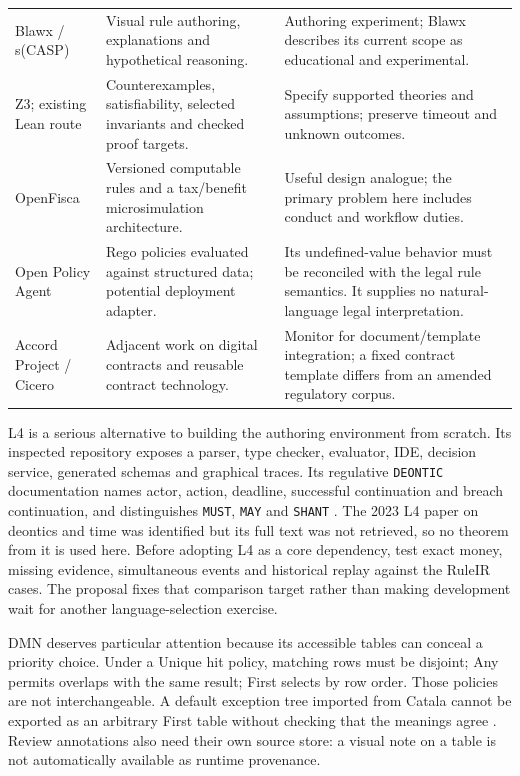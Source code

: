\begin{longtable}{P{0.19\textwidth}P{0.37\textwidth}P{0.34\textwidth}}
Blawx / s(CASP) & Visual rule authoring, explanations and hypothetical reasoning. & Authoring experiment; Blawx describes its current scope as educational and experimental. \citep{blawxcode,slaw2024}\\
Z3; existing Lean route & Counterexamples, satisfiability, selected invariants and checked proof targets. & Specify supported theories and assumptions; preserve timeout and unknown outcomes. \citep{z3code,localrepos}\\
OpenFisca & Versioned computable rules and a tax/benefit microsimulation architecture. & Useful design analogue; the primary problem here includes conduct and workflow duties. \citep{openfiscacode}\\
Open Policy Agent & Rego policies evaluated against structured data; potential deployment adapter. & Its undefined-value behavior must be reconciled with the legal rule semantics. It supplies no natural-language legal interpretation. \citep{opadocs}\\
Accord Project / Cicero & Adjacent work on digital contracts and reusable contract technology. & Monitor for document/template integration; a fixed contract template differs from an amended regulatory corpus. \citep{cicerocode}\\
\bottomrule
\end{longtable}
\endgroup

L4 is a serious alternative to building the authoring environment from scratch.
Its inspected repository exposes a parser, type checker, evaluator, IDE,
decision service, generated schemas and graphical traces. Its regulative
\texttt{DEONTIC} documentation names actor, action, deadline, successful
continuation and breach continuation, and distinguishes \texttt{MUST},
\texttt{MAY} and \texttt{SHANT} \citep{l4code}. The 2023 L4 paper on deontics
and time was identified but its full text was not retrieved, so no theorem from
it is used here. Before adopting L4 as a core dependency, test exact money,
missing evidence, simultaneous events and historical replay against the RuleIR
cases. The proposal fixes that comparison target rather than making development
wait for another language-selection exercise.

DMN deserves particular attention because its accessible tables can conceal a
priority choice. Under a Unique hit policy, matching rows must be disjoint; Any
permits overlaps with the same result; First selects by row order. Those policies
are not interchangeable. A default exception tree imported from Catala cannot be
exported as an arbitrary First table without checking that the meanings agree
\citep[sec.~8.2.11]{dmn2024}. Review annotations also need their own source store:
a visual note on a table is not automatically available as runtime provenance.

